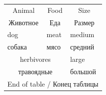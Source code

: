 \documentclass{article}
\begin{document}
\begin{center}
\begin{tabular}{lll}
\toprule
\multicolumn{1}{c}{Animal} & \multicolumn{1}{c}{Food} & \multicolumn{1}{c}{Size} \\
\multicolumn{1}{c}{Животное} & \multicolumn{1}{c}{Еда} & \multicolumn{1}{c}{Размер} \\
\midrule
dog & meat & medium \\
собака & мясо & средний \\
\multicolumn{2}{c}{herbivores} & large \\
\multicolumn{2}{c}{травоядные} & большой \\
\multicolumn{3}{c}{End of table / Конец таблицы} \\
\bottomrule
\end{tabular}
\end{center}
\end{document}
